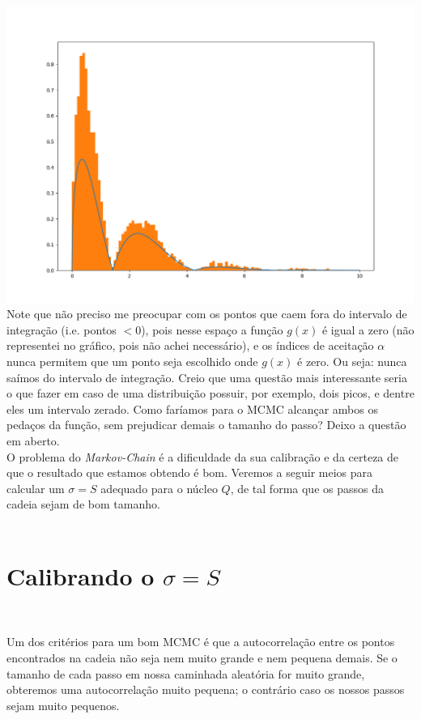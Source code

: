 \documentclass[pt12]{article}
\begin{document}
\includegraphics[scale=0.55]{Hist_h_g.png}\\

Note que não preciso me preocupar com os pontos que caem fora do intervalo de integração (i.e. pontos $<0$), pois nesse espaço a função $g(x) $ é igual a zero (não representei no gráfico, pois não achei necessário), e os índices de aceitação $\alpha$ nunca permitem que um ponto seja escolhido onde $g(x)$ é zero. Ou seja: nunca saímos do intervalo de integração. Creio que uma questão mais interessante seria o que fazer em caso de uma distribuição possuir, por exemplo, dois picos, e dentre eles um intervalo zerado. Como faríamos para o MCMC alcançar ambos os pedaços da função, sem prejudicar demais o tamanho do passo? Deixo a questão em aberto.\\

O problema do \textit{Markov-Chain} é a dificuldade da sua calibração e da certeza de que o resultado que estamos obtendo é bom. Veremos a seguir meios para calcular um $\sigma = S$ adequado para o núcleo $Q$, de tal forma que os passos da cadeia sejam de bom tamanho.\\
\

\section{Calibrando o $\sigma = S$}
\ 

Um dos critérios para um bom MCMC é que a autocorrelação entre os pontos encontrados na cadeia não seja nem muito grande e nem pequena demais. Se o tamanho de cada passo em nossa caminhada aleatória for muito grande, obteremos uma autocorrelação muito pequena; o contrário caso os nossos passos sejam muito pequenos.\\
\end{document}
